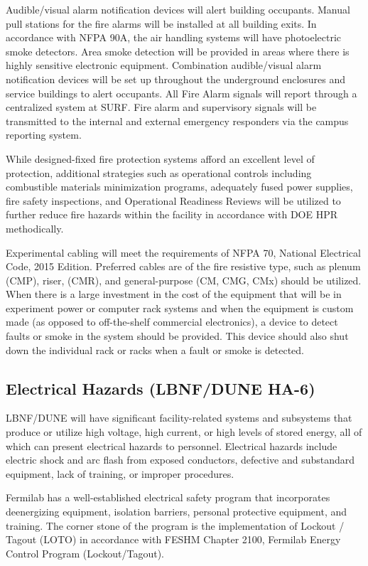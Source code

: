 Audible/visual alarm notification devices will alert building
occupants.  Manual pull stations for the fire alarms will be installed
at all building exits.  In accordance with NFPA 90A, the air handling
systems will have photoelectric smoke detectors.  Area smoke detection
will be provided in areas where there is highly sensitive electronic
equipment.  Combination audible/visual alarm notification devices will
be set up throughout the underground enclosures and service buildings
to alert occupants. All Fire Alarm signals will report through a
centralized system at SURF.  Fire alarm and supervisory signals will
be transmitted to the internal and external emergency responders via
the campus reporting system.

While designed-fixed fire protection systems afford an excellent level
of protection, additional strategies such as operational controls
including combustible materials minimization programs, adequately
fused power supplies, fire safety inspections, and Operational
Readiness Reviews will be utilized to further reduce fire hazards
within the facility in accordance with DOE HPR methodically.

Experimental cabling will meet the requirements of NFPA 70, National
Electrical Code, 2015 Edition.  Preferred cables are of the fire
resistive type, such as plenum (CMP), riser, (CMR), and
general-purpose (CM, CMG, CMx) should be utilized.  When there is a
large investment in the cost of the equipment that will be in
experiment power or computer rack systems and when the equipment is
custom made (as opposed to off-the-shelf commercial electronics), a
device to detect faults or smoke in the system should be provided.
This device should also shut down the individual rack or racks when a
fault or smoke is detected.


\subsection{Electrical Hazards (LBNF/DUNE HA-6)}

LBNF/DUNE will have significant facility-related systems and
subsystems that produce or utilize high voltage, high current, or high
levels of stored energy, all of which can present electrical hazards
to personnel. Electrical hazards include electric shock and arc flash
from exposed conductors, defective and substandard equipment, lack of
training, or improper procedures.

Fermilab has a well-established electrical safety program that
incorporates deenergizing equipment, isolation barriers, personal
protective equipment, and training. The corner stone of the program is
the implementation of Lockout / Tagout (LOTO) in accordance with FESHM
Chapter 2100, Fermilab Energy Control Program (Lockout/Tagout).

